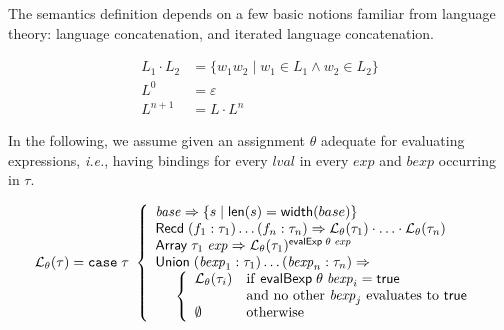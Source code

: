 \documentclass[sigplan,10pt,anonymous,review]{acmart}\settopmatter{printfolios=true,printccs=false,printacmref=false}
\newcommand{\ie}{\textit{i.e.}}
\newcommand{\konst}[1]{\ensuremath{\mathsf{#1}}}
\newcommand{\set}[1]{\ensuremath{\{ {#1} \}}}
\newcommand{\LangTheta}[1]{\ensuremath{{\mathcal L}_{\theta}({#1})}}
\begin{document}
The semantics definition depends on a few basic notions familiar from
language theory: language concatenation, and iterated language
concatenation.

\begin{align*}
L_1 \cdot L_2 &= \set{w_1 w_2 \mid w_1 \in L_1 \land w_2 \in  L_2} \\
L^0 &= \varepsilon \\
L^{n+1} &= L \cdot L^n
\end{align*}


\begin{definition}

 In the following, we assume given an assignment $\theta$ adequate for
evaluating expressions, \ie, having bindings for every
$\mathit{lval}$ in every $\mathit{exp}$ and $\mathit{bexp}$
occurring in $\tau$.

\[
\LangTheta{\tau} =
\mathtt{case}\; \tau\
 \left\{
 \begin{array}{l}
 \mathit{base} \Rightarrow \set{s \mid \konst{len}(s) = \konst{width}(base)} \\
 \konst{Recd}\; (f_1 : \tau_1) \ldots (f_n : \tau_n)
      \Rightarrow \LangTheta{\tau_1} \cdot \ldots \cdot \LangTheta{\tau_n}
\\
 \konst{Array}\; \tau_1 \; \mathit{exp}
      \Rightarrow  \LangTheta{\tau_1}^{\konst{evalExp}\;\theta\;\mathit{exp}}
\\
 \konst{Union}\; (\mathit{bexp}_1 : \tau_1) \ldots (\mathit{bexp}_n : \tau_n) \Rightarrow \\
  \hspace*{5mm}
 \left\{
 \begin{array}{ll}
    \LangTheta{\tau_i} &  \mathrm{if}\ \konst{evalBexp}\;\theta\;\mathit{bexp}_i = \konst{true} \\
                  & \mathrm{and\ no\ other}\ \mathit{bexp}_j\ \mathrm{evaluates\ to}\ \konst{true}  \\
    \emptyset & \mathrm{otherwise}
 \end{array}
 \right.
 \\
\end{array}
 \right.
\]
\end{definition}
\end{document}
